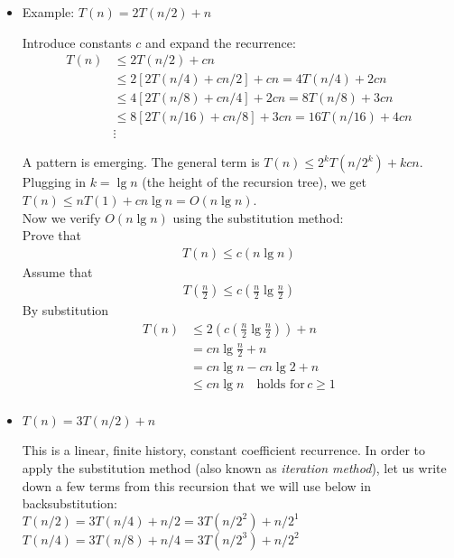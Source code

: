 \documentclass[a4paper]{article}
\begin{document}
\begin{itemize}

\item Example: $T(n) = 2T(n/2) + n$

Introduce constants $c$ and expand the recurrence: \\
\begin{align*}
T(n) & \leq 2T(n/2) + cn \\
~ & \leq 2[2T(n/4) + cn/2] + cn = 4T(n/4)+2cn \\
~ & \leq 4[2T(n/8) + cn/4] + 2cn = 8T(n/8)+3cn \\
~ & \leq 8[2T(n/16) + cn/8] + 3cn = 16T(n/16)+4cn \\
~ & \vdots
\end{align*}

A pattern is emerging. The general term is $T(n) \leq 2^k T(n/2^k) + kcn$. Plugging in $k=\lg n$ (the height of the recursion tree), we get $T(n) \leq nT(1) + cn \lg n = O(n \lg n)$.\\
\newline
Now we verify $O(n \lg n)$ using the substitution method:\\
\newline
Prove that
\begin{align*}
T(n) \leq c(n \lg n)
\end{align*}
Assume that
\begin{align*}
T(\frac{n}{2}) \leq c(\frac{n}{2} \lg \frac{n}{2})
\end{align*}
By substitution
\begin{align*}
T(n) & \leq 2(c(\frac{n}{2} \lg \frac{n}{2})) +  n \\
~ & = cn \lg \frac{n}{2} + n \\
~ & = cn \lg n - cn \lg 2 + n \\
~ & \leq cn \lg n \quad \text{holds for} \, c \geq 1 \\
\end{align*}

\item $T(n) = 3T(n/2) + n$ 

This is a linear, finite history, constant coefficient recurrence. In order to apply the substitution method (also known as \textit{iteration method}), let us write down a few terms from this recursion that we will use below in backsubstitution: \\ 

$T(n/2) = 3T(n/4) + n/2 = 3T(n/2^2) + n/2^1$ \\
$T(n/4) = 3T(n/8) + n/4 = 3T(n/2^3) + n/2^2$ \\


\end{itemize}
\end{document}
